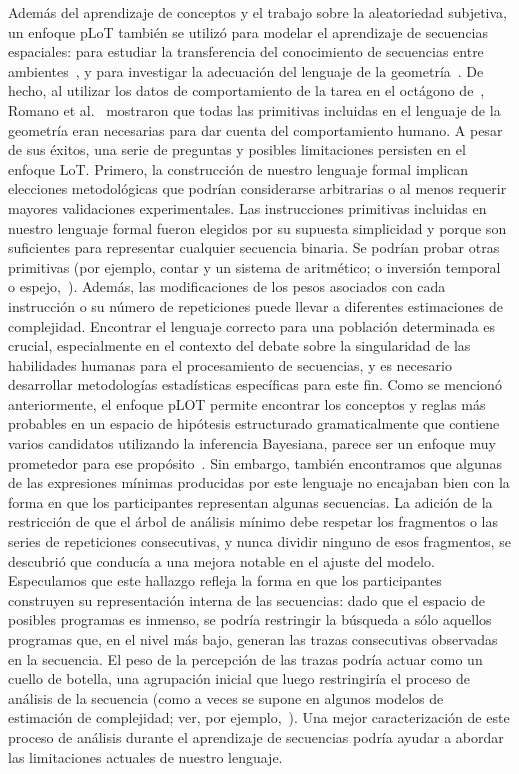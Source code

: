 Además del aprendizaje de conceptos y el trabajo sobre la aleatoriedad subjetiva, un enfoque pLoT también se utilizó para modelar el aprendizaje de secuencias espaciales: para estudiar la transferencia del conocimiento de secuencias entre ambientes~\cite{yildirim2015learning}, y para investigar la adecuación del lenguaje de la geometría~\cite{romano2018bayesian}. De hecho, al utilizar los datos de comportamiento de la tarea en el octágono de~\cite{amalric2017language}, Romano et al.~\cite{romano2018bayesian} mostraron que todas las primitivas incluidas en el lenguaje de la geometría eran necesarias para dar cuenta del comportamiento humano. A pesar de sus éxitos, una serie de preguntas y posibles limitaciones persisten en el enfoque LoT. Primero, la construcción de nuestro lenguaje formal implican elecciones metodológicas que podrían considerarse arbitrarias o al menos requerir mayores validaciones experimentales. Las instrucciones primitivas incluidas en nuestro lenguaje formal fueron elegidos por su supuesta simplicidad y porque son suficientes para representar cualquier secuencia binaria. Se podrían probar otras primitivas (por ejemplo, contar y un sistema de aritmético; o inversión temporal o espejo,~\cite{f10}). Además, las modificaciones de los pesos asociados con cada instrucción o su número de repeticiones puede llevar a diferentes estimaciones de complejidad. Encontrar el lenguaje correcto para una población determinada es crucial, especialmente en el contexto del debate sobre la singularidad de las habilidades humanas para el procesamiento de secuencias, y es necesario desarrollar metodologías estadísticas específicas para este fin. Como se mencionó anteriormente, el enfoque pLOT permite encontrar los conceptos y reglas más probables en un espacio de hipótesis estructurado gramaticalmente que contiene varios candidatos utilizando la inferencia Bayesiana, parece ser un enfoque muy prometedor para ese propósito~\cite{goodman2008rational,piantadosi2016four,romano2018bayesian}. Sin embargo, también encontramos que algunas de las expresiones mínimas producidas por este lenguaje no encajaban bien con la forma en que los participantes representan algunas secuencias. La adición de la restricción de que el árbol de análisis mínimo debe respetar los fragmentos o las series de repeticiones consecutivas, y nunca dividir ninguno de esos fragmentos, se descubrió que conducía a una mejora notable en el ajuste del modelo. Especulamos que este hallazgo refleja la forma en que los participantes construyen su representación interna de las secuencias: dado que el espacio de posibles programas es inmenso, se podría restringir la búsqueda a sólo aquellos programas que, en el nivel más bajo, generan las trazas consecutivas observadas en la secuencia. El peso de la percepción de las trazas podría actuar como un cuello de botella, una agrupación inicial que luego restringiría el proceso de análisis de la secuencia (como a veces se supone en algunos modelos de estimación de complejidad; ver, por ejemplo,~\cite{f98}). Una mejor caracterización de este proceso de análisis durante el aprendizaje de secuencias podría ayudar a abordar las limitaciones actuales de nuestro lenguaje.

